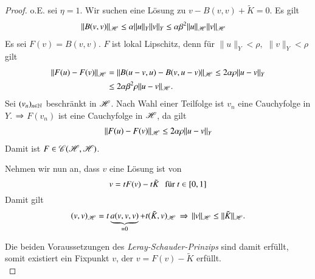 \begin{proof}
    o.E. sei $\eta=1$. Wir suchen eine Lösung zu $v-B(v,v)+\tilde K=0$. Es gilt
    \begin{align*}
        \|B(v,v)\|_{\mathscr H}& \leq \alpha \|u\|_Y\|v\|_Y\leq \alpha \beta^2 \|u\|_{\mathscr H}\|v\|_{\mathscr H}
    \end{align*}
    Es sei $F(v)=B(v,v)$. $F$ ist lokal Lipschitz, denn für $\|u\|_Y< \rho,$ $\|v\|_Y<\rho$ gilt
    \begin{align*}
        \|F(u)-F(v)\|_{\mathscr H} &= \|B(u-v,u)-B(v,u-v)\|_{\mathscr H}\leq 2\alpha \rho \|u-v\|_Y\\
            &\leq 2\alpha\beta^2 \rho \|u-v\|_{\mathscr H}.
    \end{align*}
    Sei $(v_n)_{n\in \mathbb{N}}$ beschränkt in $\mathscr H$. Nach Wahl einer Teilfolge ist $v_n$ eine Cauchyfolge
    in $Y$. $\Rightarrow$ $F(v_n)$ ist eine Cauchyfolge in $\mathscr H$, da gilt
    \begin{align*}
        \|F(u)-F(v)\|_{\mathscr H}\leq 2\alpha \rho\|u-v\|_Y
    \end{align*}
    Damit ist $F\in \mathscr C(\mathscr H,\mathscr H)$. 

    Nehmen wir nun an, dass $v$ eine Lösung ist von
    \[
        v=tF(v)-t\tilde K \hspace{.25cm} \text{für } t\in [0,1]
    \]
    Damit gilt
    \[
        (v,v)_{\mathscr H} = t\underbrace{a(v,v,v)}_{=0} + t(\tilde K, v)_{\mathscr H} \, \Rightarrow \,
        \|v\|_{\mathscr H}\leq \|\tilde K\|_{\mathscr H}.
    \]

    Die beiden Voraussetzungen des \textit{Leray-Schauder-Prinzips} sind damit erfüllt,
    somit existiert ein Fixpunkt $v$, der $ v=F(v)-\tilde K$ erfüllt. \[ \]
\end{proof}

